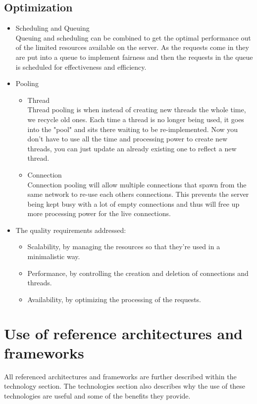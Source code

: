 \documentclass[12pt, oneside]{article}
\begin{document}
	\subsection{Optimization}
		\begin{itemize}
			\item Scheduling and Queuing\\
			Queuing and scheduling can be combined to get the optimal performance out of the limited resources available on the server. As the requests come in they are put into a queue to implement fairness and then the requests in the queue is scheduled for effectiveness and efficiency.
			\item Pooling\\
				\begin{itemize}
					\item Thread\\
					Thread pooling is when instead of creating new threads the whole time, we recycle old ones. Each time a thread is no longer being used, it goes into the "pool" and sits there waiting to be re-implemented. Now you don't have to use all the time and processing power to create new threads, you can just update an already existing one to reflect a new thread.
					\item Connection\\
					Connection pooling will allow multiple connections that spawn from the same network to re-use each others connections. This prevents the server being kept busy with a lot of empty connections and thus will free up more processing power for the live connections.
				\end{itemize}
			\item The quality requirements addressed:
			\begin{itemize}
				\item Scalability, by managing the resources so that they're used in a minimalistic way.
				\item Performance, by controlling the creation and deletion of connections and threads.
				\item Availability, by optimizing the processing of the requests.
			\end{itemize}
		\end{itemize}

\section{Use of reference architectures and frameworks}
All referenced architectures and frameworks are further described within the technology section. The technologies section also describes why the use of these technologies are useful and some of the benefits they provide.
\end{document}
